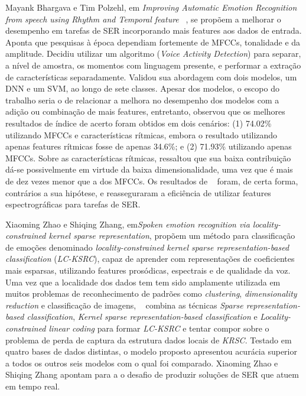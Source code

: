 Mayank Bhargava e Tim Polzehl, em \textit{Improving Automatic Emotion Recognition from speech using Rhythm and Temporal feature} ~\cite{11}, se propõem a melhorar o desempenho em tarefas de \acrshort{SER} incorporando mais features aos dados de entrada. Aponta que pesquisas à época dependiam fortemente de \acrshort{MFCC}s, tonalidade e da amplitude. Decidiu utilizar um algoritmo (\textit{Voice Activity Detection}) para separar, a nível de amostra, os momentos com linguagem presente, e performar a extração de características separadamente. Validou sua abordagem com dois modelos, um \acrshort{DNN} e um \acrshort{SVM}, ao longo de sete classes. Apesar dos modelos, o escopo do trabalho seria o de relacionar a melhora no desempenho dos modelos com a adição ou combinação de mais features, entretanto, observou que os melhores resultados de índice de acerto foram obtidos em dois cenários: (1) 74.02\% utilizando \acrshort{MFCC}s e características rítmicas, embora o resultado utilizando apenas features rítmicas fosse de apenas 34.6\%; e (2) 71.93\% utilizando apenas \acrshort{MFCC}s. Sobre as características rítmicas, ressaltou que sua baixa contribuição dá-se possivelmente em virtude da baixa dimensionalidade, uma vez que é mais de dez vezes menor que a dos \acrshort{MFCC}s. Os resultados de ~\cite{11} foram, de certa forma, contrários a sua hipótese, e reasseguraram a eficiência de utilizar features espectrográficas para tarefas de SER.

Xiaoming Zhao e Shiqing Zhang, em\textit{Spoken emotion recognition via locality-constrained kernel sparse representation}\cite{32.31}, propõem um método para classificação de emoções denominado \textit{locality-constrained kernel sparse representation-based classification} (\textit{LC-KSRC}), capaz de aprender com representações de coeficientes mais esparsas, utilizando features prosódicas, espectrais e de qualidade da voz. Uma vez que a localidade dos dados tem tem sido amplamente utilizada em muitos problemas de reconhecimento de padrões como \textit{clustering}, \textit{dimensionality reduction} e classificação de imagens, ~\cite{32.31} combina as técnicas \textit{Sparse representation-based classification}, \textit{Kernel sparse representation-based classification} e \textit{Locality-constrained linear coding} para formar \textit{LC-KSRC} e tentar compor sobre o problema de perda de captura da estrutura dados locais de \textit{KRSC}. Testado em quatro bases de dados distintas, o modelo proposto apresentou acurácia superior a todos os outros seis modelos com o qual foi comparado. Xiaoming Zhao e Shiqing Zhang apontam para a o desafio de produzir soluções de SER que atuem em tempo real.

